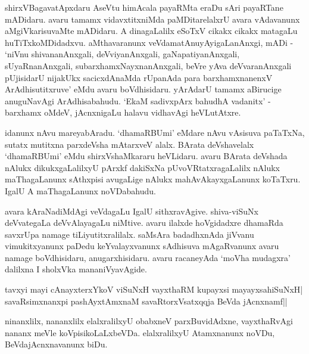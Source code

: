 shirxVBagavatApxdaru AseVtu himAcala payaRMta eraDu sAri payaRTane mADidaru. avaru tamamx vidavxtitxniMda paMDitarelalxrU avara vAdavanunx aMgiVkarisuvaMte mADidaru. A dinagaLalilx eSoTxV cikakx cikakx matagaLu huTiTxkoMDidadxvu. aMthavaranunx veVdamatAnuyAyigaLanAnxgi, mADi - `niVnu shivananAnxgali, deVviyanAnxgali, gaNapatiyanAnxgali, sUyaRnanAnxgali, subarxhamxNayxnanAnxgali, beVre yAva deVvaranAnxgali pUjisidarU nijakUkx sacicxdAnaMda rUpanAda para barxhamxnanenxV ArAdhisutitxruve' eMdu avaru boVdhisidaru. yArAdarU tamamx aBirucige anuguNavAgi ArAdhisabahudu. `EkaM sadivxpArx bahudhA vadanitx' - barxhamx oMdeV, jAcnxnigaLu halavu vidhavAgi heVLutAtxre.

idanunx nAvu mareyabAradu. `dhamaRBUmi' eMdare nAvu vAsisuva paTaTx‌Na, sutatx mutitxna parxdeVsha mAtarxveV alalx. BArata deVshavelalx `dhamaRBUmi' eMdu shirxVshaMkararu heVLidaru. avaru BArata deVshada nAlukx dikukxgaLalilxyU pArxkf dakiSxNa pUvoVRtatxragaLalilx nAlukx maThagaLanunx sAthxpisi avugaLige nAlukx mahAvAkayxgaLanunx koTaTxru. IgalU A maThagaLanunx noVDabahudu.

avara kAraNadiMdAgi veVdagaLu IgalU sithxravAgive. shiva-viSuNx deVvategaLa deVvAlayagaLu niMtive. avaru ilalxde hoVgidadxre dhamaRda savxrUpa namage tiLiyutitxralilalx. saMsAra badadhxnAda jiVvanu vimukitxyanunx paDedu keYvalayxvanunx sAdhisuva mAgaRvanunx avaru namage boVdhisidaru, anugarxhisidaru. avaru racaneyAda `moVha mudagxra' dalilxna I sholxVka mananiVyavAgide.

\begin{shloka}
tavxyi mayi cAnayxterxYkoV viSuNxH vayxthaRM kupayxsi mayayxsahiSuNxH|\\
savaRsimxnanxpi pashAyxtAmxnaM savaRtorxVsatxqqja BeVda jAcnxnamf||
\end{shloka}

ninanxlilx, nananxlilx elalxralilxyU obabxneV parxBuvidAdxne, vayxthaRvAgi nananx meVle koVpisikoLaLxbeVDa. elalxralilxyU Atamxnanunx noVDu, BeVdajAcnxnavanunx biDu.



\endchapter
